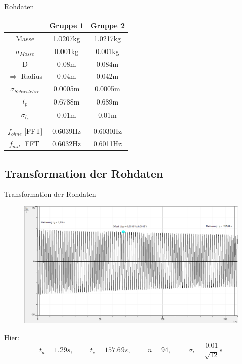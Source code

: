 \documentclass[11pt]{beamer}
\begin{document}
\begin{frame}{Rohdaten}
\begin{multicols}{2}
\begin{figure}[H]
\end{figure}
\columnbreak
\begin{center}
\begin{tabular}{c|c|c}
 & Gruppe 1 & Gruppe 2 \\ 
\hline
Masse & 1.0207kg & 1.0217kg \\ 
$\sigma_{Masse}$ & 0.001kg & 0.001kg \\ 
D & 0.08m & 0.084m \\ 
$\Rightarrow$ Radius & 0.04m & 0.042m \\ 
$\sigma_{Schieblehre}$ & 0.0005m & 0.0005m \\ 
$l_p$ & 0.6788m & 0.689m \\ 
$\sigma_{l_p}$ & 0.01m & 0.01m \\ 
\hline
 & &  \\
$f_{ohne}$ [FFT] & 0.6039Hz & 0.6030Hz \\ 
$f_{mit}$ [FFT] & 0.6032Hz & 0.6011Hz \\ 
\end{tabular} 
\end{center}
\end{multicols}
\end{frame}

\subsection{Transformation der Rohdaten}
\begin{frame}{Transformation der Rohdaten}
\begin{figure}[H]
\centering
\includegraphics[scale=0.3]{Bilder/Erdbeschleunigung_bestimmungF.png}
\end{figure}
Hier:
\begin{equation*}
t_a=1.29s, \hspace{1cm} t_e=157.69s, \hspace{1cm} n=94, \hspace{1cm} \sigma_t=\frac{0.01}{\sqrt{12}}s
\end{equation*}
\end{frame}
\end{document}
